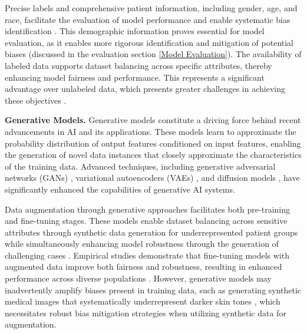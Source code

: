 Precise labels and comprehensive patient information, including gender, age, and race, facilitate the evaluation of model performance and enable systematic bias identification \cite{reis_brax_2022, nakayama_brset_2024, irvin_chexpert_2019, groh_evaluating_2021}. This demographic information proves essential for model evaluation, as it enables more rigorous identification and mitigation of potential biases (discussed in the evaluation section \ref{Model Evaluation}). The availability of labeled data supports dataset balancing across specific attributes, thereby enhancing model fairness and performance. This represents a significant advantage over unlabeled data, which presents greater challenges in achieving these objectives \cite{ashurst_fairness_2023}.

\textbf{Generative Models.} Generative models constitute a driving force behind recent advancements in AI and its applications. These models learn to approximate the probability distribution of output features conditioned on input features, enabling the generation of novel data instances that closely approximate the characteristics of the training data. Advanced techniques, including generative adversarial networks (GANs) \cite{liu_radimagegan_2023}, variational autoencoders (VAEs) \cite{pesteie_adaptive_2019}, and diffusion models \cite{pinaya_brain_2022}, have significantly enhanced the capabilities of generative AI systems.

Data augmentation through generative approaches facilitates both pre-training and fine-tuning stages. These models enable dataset balancing across sensitive attributes through synthetic data generation for underrepresented patient groups while simultaneously enhancing model robustness through the generation of challenging cases \cite{cui_classes_nodate}. Empirical studies demonstrate that fine-tuning models with augmented data improve both fairness and robustness, resulting in enhanced performance across diverse populations \cite{ktena_generative_2023}. However, generative models may inadvertently amplify biases present in training data, such as generating synthetic medical images that systematically underrepresent darker skin tones \cite{zhang_fairskin_2024}, which necessitates robust bias mitigation strategies when utilizing synthetic data for augmentation.

